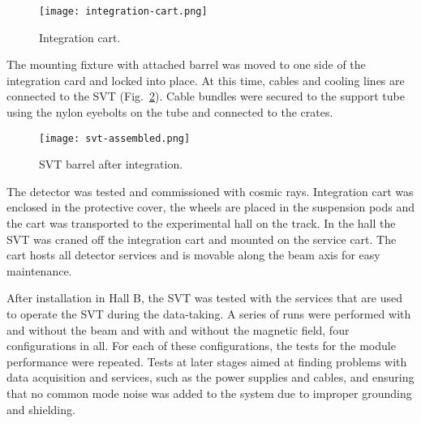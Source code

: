 \begin{figure}[hbt] 
\centering 
\texttt{[image: integration-cart.png]}
\caption{Integration cart.}
\label{fig:integration-cart}
\end{figure}

The mounting fixture with attached barrel was moved to one side of the integration card and locked into place. At this time, cables and cooling lines are connected to the SVT (Fig.~\ref{fig:svt-assembled}). Cable bundles were secured to the support tube using the nylon eyebolts on the tube and connected to the crates. 

\begin{figure}[hbt] 
\centering 
\texttt{[image: svt-assembled.png]}
\caption{SVT barrel after integration.}
\label{fig:svt-assembled}
\end{figure}

The detector was tested and commissioned with cosmic rays. Integration cart was enclosed in the protective cover, the wheels are placed in the suspension pods and the cart was transported to the experimental hall on the track. In the hall the SVT was craned off the integration cart and mounted on the service cart. The cart hosts all detector services and is movable along the beam axis for easy maintenance.

After installation in Hall B, the SVT was tested with the services that are used to operate the SVT during the data-taking. A series of runs were performed with and without the beam and with and without the magnetic field, four configurations in all. For each of these configurations, the tests for the module performance were repeated. Tests at later stages aimed at finding problems with data acquisition and services, such as the power supplies and cables, and ensuring that no common mode noise was added to the system due to improper grounding and shielding. 

